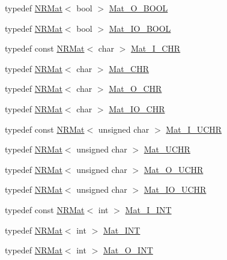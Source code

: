 \begin{DoxyCompactItemize}
\item 
typedef \mbox{\hyperlink{classNR_1_1NRMat}{N\+R\+Mat}}$<$ bool $>$ \mbox{\hyperlink{namespaceNR_af6c2362243608fcb5bf9c0d347209d80}{Mat\+\_\+\+O\+\_\+\+B\+O\+OL}}
\item 
typedef \mbox{\hyperlink{classNR_1_1NRMat}{N\+R\+Mat}}$<$ bool $>$ \mbox{\hyperlink{namespaceNR_a82a88d1a8eaf0a352f9dc5d5976253c4}{Mat\+\_\+\+I\+O\+\_\+\+B\+O\+OL}}
\item 
typedef const \mbox{\hyperlink{classNR_1_1NRMat}{N\+R\+Mat}}$<$ char $>$ \mbox{\hyperlink{namespaceNR_aee0811ffb93cf889082b088ab2e4b37f}{Mat\+\_\+\+I\+\_\+\+C\+HR}}
\item 
typedef \mbox{\hyperlink{classNR_1_1NRMat}{N\+R\+Mat}}$<$ char $>$ \mbox{\hyperlink{namespaceNR_ad2f728fc5ba81ae9f08834b7d9efcb1d}{Mat\+\_\+\+C\+HR}}
\item 
typedef \mbox{\hyperlink{classNR_1_1NRMat}{N\+R\+Mat}}$<$ char $>$ \mbox{\hyperlink{namespaceNR_a018b6abc03718b84730383f05f4dba29}{Mat\+\_\+\+O\+\_\+\+C\+HR}}
\item 
typedef \mbox{\hyperlink{classNR_1_1NRMat}{N\+R\+Mat}}$<$ char $>$ \mbox{\hyperlink{namespaceNR_aebd44b690f4f5f165100ac3d68c3405f}{Mat\+\_\+\+I\+O\+\_\+\+C\+HR}}
\item 
typedef const \mbox{\hyperlink{classNR_1_1NRMat}{N\+R\+Mat}}$<$ unsigned char $>$ \mbox{\hyperlink{namespaceNR_a0c5678809943e339bc2b0c0b57420a15}{Mat\+\_\+\+I\+\_\+\+U\+C\+HR}}
\item 
typedef \mbox{\hyperlink{classNR_1_1NRMat}{N\+R\+Mat}}$<$ unsigned char $>$ \mbox{\hyperlink{namespaceNR_a1752fb9659ce8f5ff7e61ac55d858073}{Mat\+\_\+\+U\+C\+HR}}
\item 
typedef \mbox{\hyperlink{classNR_1_1NRMat}{N\+R\+Mat}}$<$ unsigned char $>$ \mbox{\hyperlink{namespaceNR_aaa6b2dfb98d1233de1d71df0c092aced}{Mat\+\_\+\+O\+\_\+\+U\+C\+HR}}
\item 
typedef \mbox{\hyperlink{classNR_1_1NRMat}{N\+R\+Mat}}$<$ unsigned char $>$ \mbox{\hyperlink{namespaceNR_af70383f9e6e29193c2f46b4fa917222f}{Mat\+\_\+\+I\+O\+\_\+\+U\+C\+HR}}
\item 
typedef const \mbox{\hyperlink{classNR_1_1NRMat}{N\+R\+Mat}}$<$ int $>$ \mbox{\hyperlink{namespaceNR_a1e59f4068736f6f8a60d68e927e65a08}{Mat\+\_\+\+I\+\_\+\+I\+NT}}
\item 
typedef \mbox{\hyperlink{classNR_1_1NRMat}{N\+R\+Mat}}$<$ int $>$ \mbox{\hyperlink{namespaceNR_ae015c8943548619daec89e8309eefee7}{Mat\+\_\+\+I\+NT}}
\item 
typedef \mbox{\hyperlink{classNR_1_1NRMat}{N\+R\+Mat}}$<$ int $>$ \mbox{\hyperlink{namespaceNR_aec8b2e2473f3c741647c723acc1fc6d6}{Mat\+\_\+\+O\+\_\+\+I\+NT}}

\end{DoxyCompactItemize}
